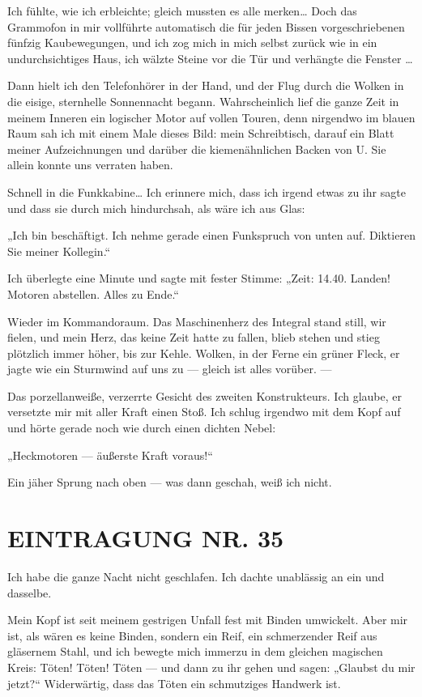 Ich fühlte, wie ich erbleichte; gleich mussten es alle merken\ldots{}
Doch das Grammofon in mir vollführte automatisch die für jeden
Bissen vorgeschriebenen fünfzig Kaubewegungen, und ich zog mich in
mich selbst zurück wie in ein undurchsichtiges Haus, ich wälzte
Steine vor die Tür und verhängte die Fenster \ldots{}

Dann hielt ich den Telefonhörer in der Hand, und der Flug durch die
Wolken in die eisige, sternhelle Sonnennacht begann. Wahrscheinlich
lief die ganze Zeit in meinem Inneren ein logischer Motor auf
vollen Touren, denn nirgendwo im blauen Raum sah ich mit einem Male
dieses Bild: mein Schreibtisch, darauf ein Blatt meiner
Aufzeichnungen und darüber die kiemenähnlichen Backen von U. Sie
allein konnte uns verraten haben.

Schnell in die Funkkabine\ldots{} Ich
erinnere mich, dass ich irgend etwas zu ihr sagte und dass sie
durch mich hindurchsah, als wäre ich aus Glas:

„Ich bin beschäftigt. Ich nehme gerade einen Funkspruch von unten
auf. Diktieren Sie meiner Kollegin.“

Ich überlegte eine Minute und
sagte mit fester Stimme: „Zeit: 14.40. Landen! Motoren abstellen.
Alles zu Ende.“

Wieder im Kommandoraum. Das Maschinenherz des
Integral stand still, wir fielen, und mein Herz, das keine Zeit
hatte zu fallen, blieb stehen und stieg plötzlich immer höher, bis
zur Kehle. Wolken, in der Ferne ein grüner Fleck, er jagte wie ein
Sturmwind auf uns zu — gleich ist alles vorüber. —

Das porzellanweiße, verzerrte Gesicht des zweiten Konstrukteurs.
Ich glaube, er versetzte mir mit aller Kraft einen Stoß. Ich schlug
irgendwo mit dem Kopf auf und hörte gerade noch wie durch einen
dichten Nebel:

„Heckmotoren — äußerste Kraft voraus!“

Ein jäher Sprung nach oben — was dann geschah, weiß ich nicht.

\section{EINTRAGUNG NR. 35}

Ich habe die ganze Nacht nicht geschlafen. Ich dachte unablässig an
ein und dasselbe.

Mein Kopf ist seit meinem gestrigen Unfall fest mit Binden
umwickelt. Aber mir ist, als wären es keine Binden, sondern ein
Reif, ein schmerzender Reif aus gläsernem Stahl, und ich bewegte
mich immerzu in dem gleichen magischen Kreis: Töten! Töten! Töten —
und dann zu ihr gehen und sagen: „Glaubst du mir jetzt?“
Widerwärtig, dass das Töten ein schmutziges Handwerk ist.

